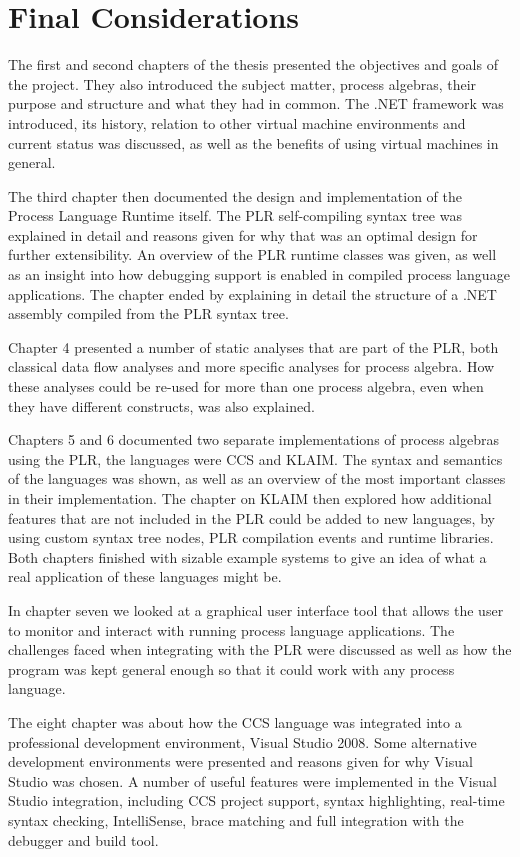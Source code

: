 \chapter{Final Considerations}

	The first and second chapters of the thesis presented the objectives and 
	goals of the project. They also introduced the subject matter, process 
	algebras, their purpose and structure and what they had in common. The .NET 
	framework was introduced, its history, relation to other virtual 
	machine environments and current status was discussed, as well as the 
	benefits of using virtual machines in general.
	
	The third chapter then documented the design and implementation of the 
	Process Language Runtime itself. The PLR self-compiling syntax tree was 
	explained in detail and reasons given for why that was an optimal design for 
	further extensibility. An overview of the PLR runtime classes was given, as 
	well as an insight into how debugging support is enabled in compiled process 
	language applications. The chapter ended by explaining in detail the 
	structure of a .NET assembly compiled from the PLR syntax tree.
	
	Chapter 4 presented a number of static analyses that are part of the PLR, 
	both classical data flow analyses and more specific analyses for process 
	algebra. How these analyses could be re-used for more than one process 
	algebra, even when they have different constructs, was also explained.
	
	Chapters 5 and 6 documented two separate implementations of process algebras 
	using the PLR, the languages were CCS and KLAIM. The syntax and semantics of 
	the languages was shown, as well as an overview of the most important 
	classes in their implementation. The chapter on KLAIM then explored how 
	additional features that are not included in the PLR could be added to new 
	languages, by using custom syntax tree nodes, PLR compilation events and 
	runtime libraries. Both chapters finished with sizable example systems to 
	give an idea of what a real application of these languages might be.
	
	In chapter seven we looked at a graphical user interface tool that allows
	the user to monitor and interact with running process language applications.
	The challenges faced when integrating with the PLR were discussed as well as
	how the program was kept general enough so that it could work with any 
	process language.
	
	The eight chapter was about how the CCS language was integrated into a 
	professional development environment, Visual Studio 2008. Some alternative 
	development environments were presented and reasons given for why Visual 
	Studio was chosen. A number of useful features were implemented in the 
	Visual Studio integration, including CCS project support, syntax 
	highlighting, real-time syntax checking, IntelliSense, brace matching and 
	full integration with the debugger and build tool.
	
